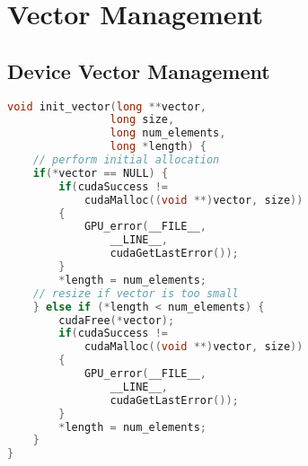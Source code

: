 \chapter{Vector Management} \label{chap:VectorManagement}
\section{Device Vector Management} \label{sec:DeviceVectorManagement}
\begin{lstlisting}[language=C,caption={Device Vector Management}]
void init_vector(long **vector, 
                long size, 
                long num_elements, 
                long *length) {
    // perform initial allocation
	if(*vector == NULL) {
		if(cudaSuccess != 
		    cudaMalloc((void **)vector, size))
		{
		    GPU_error(__FILE__, 
		        __LINE__, 
		        cudaGetLastError());
		}
		*length = num_elements;
	// resize if vector is too small
	} else if (*length < num_elements) {
		cudaFree(*vector);
		if(cudaSuccess != 
		    cudaMalloc((void **)vector, size)) 
		{
		    GPU_error(__FILE__, 
		        __LINE__, 
		        cudaGetLastError());
		}
		*length = num_elements;
	}
}
\end{lstlisting}